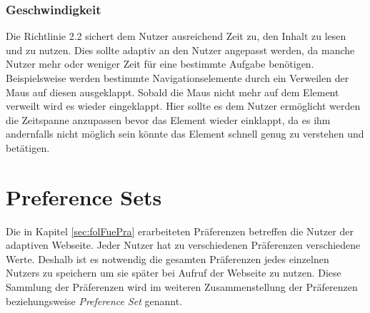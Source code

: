 \documentclass[12pt, paper=a4, bibtotoc, toc=listof, headsepline=true, numbers=endperiod]{scrreprt}
\begin{document}
\subsection{Geschwindigkeit}
Die Richtlinie 2.2 sichert dem Nutzer ausreichend Zeit zu, den Inhalt zu lesen und zu nutzen. Dies sollte adaptiv an den Nutzer angepasst werden, da manche Nutzer mehr oder weniger Zeit für eine bestimmte Aufgabe benötigen. Beispielsweise werden bestimmte Navigationselemente durch ein Verweilen der Maus auf diesen ausgeklappt. Sobald die Maus nicht mehr auf dem Element verweilt wird es wieder eingeklappt. Hier sollte es dem Nutzer ermöglicht werden die Zeitspanne anzupassen bevor das Element wieder einklappt, da es ihm andernfalls nicht möglich sein könnte das Element schnell genug zu verstehen und betätigen.
\chapter{Preference Sets}
Die in Kapitel \ref{sec:folFuePra} erarbeiteten Präferenzen betreffen die Nutzer der adaptiven Webseite. Jeder Nutzer hat zu verschiedenen Präferenzen verschiedene Werte. Deshalb ist es notwendig die gesamten Präferenzen jedes einzelnen Nutzers zu speichern um sie später bei Aufruf der Webseite zu nutzen. Diese Sammlung der Präferenzen wird im weiteren Zusammenstellung der Präferenzen beziehungsweise \emph{Preference Set} genannt. 
\end{document}
